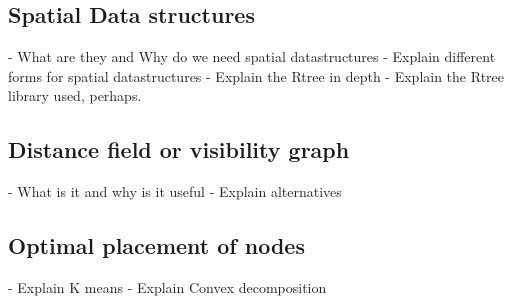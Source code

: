 \subsection{Spatial Data structures}
- What are they and Why do we need spatial datastructures
- Explain different forms for spatial datastructures
- Explain the Rtree in depth
- Explain the Rtree library used, perhaps.

\subsection{Distance field or visibility graph}
- What is it and why is it useful
- Explain alternatives

\subsection{Optimal placement of nodes}
- Explain K means
- Explain Convex decomposition





















